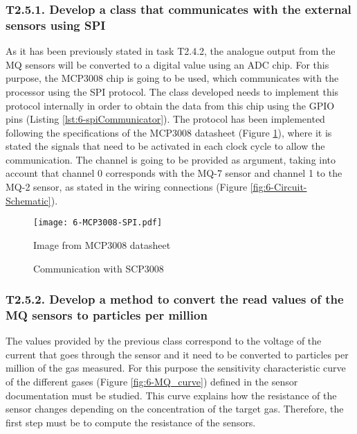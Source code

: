 \subsubsection{T2.5.1. Develop a class that communicates with the external sensors using \ac{SPI}}
As it has been previously stated in task T2.4.2, the analogue output from the MQ sensors will be converted to a digital value using an \ac{ADC} chip. For this purpose, the MCP3008 chip \cite{ADC} is going to be used, which communicates with the processor using the \ac{SPI} protocol. The class developed needs to implement this protocol internally in order to obtain the data from this chip using the GPIO pins (Listing \ref{lst:6-spiCommunicator}). The protocol has been implemented following the specifications of the MCP3008 datasheet (Figure \ref{fig:6-MCP3008-SPI}), where it is stated the signals that need to be activated in each clock cycle to allow the communication. The channel is going to be provided as argument, taking into account that channel 0 corresponds with the MQ-7 sensor and channel 1 to the MQ-2 sensor, as stated in the wiring connections (Figure \ref{fig:6-Circuit-Schematic}).

\begin{figure}[!h]
	\begin{center}
		\texttt{[image: 6-MCP3008-SPI.pdf]}
		\caption{Communication with SCP3008}{Image from MCP3008 datasheet \cite{ADC}}
		\label{fig:6-MCP3008-SPI}
	\end{center}
\end{figure}




\subsubsection{T2.5.2. Develop a method to convert the read values of the MQ sensors to particles per million}
The values provided by the previous class correspond to the voltage of the current that goes through the sensor and it need to be converted to particles per million of the gas measured. For this purpose the sensitivity characteristic curve of the different gases (Figure \ref{fig:6-MQ_curve}) defined in the sensor documentation must be studied. This curve explains how the resistance of the sensor changes depending on the concentration of the target gas. Therefore, the first step must be to compute the resistance of the sensors. 

